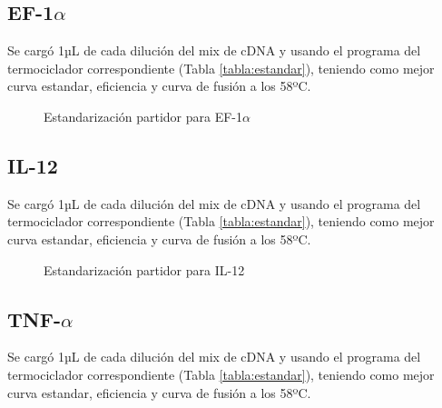 \documentclass[12pt,a4paper,oneside]{scrbook}
\begin{document}
\subsection{EF-1$\alpha$}

Se cargó 1µL de cada dilución del mix de cDNA y usando el programa del
termociclador correspondiente (Tabla \ref{tabla:estandar}), teniendo
como mejor curva estandar, eficiencia y curva de fusión a los 58ºC.

\begin{figure}[h!]
    \centering
    \caption {Estandarización partidor para EF-1$\alpha$}
    \label {fig:ef1a}
\end{figure}

\subsection{IL-12}

Se cargó 1µL de cada dilución del mix de cDNA y usando el programa del
termociclador correspondiente (Tabla \ref{tabla:estandar}), teniendo
como mejor curva estandar, eficiencia y curva de fusión a los 58ºC.

\begin{figure}[h!]
    \centering
    \caption {Estandarización partidor para IL-12}
    \label {fig:il12}
\end{figure}

\subsection{TNF-$\alpha$}

Se cargó 1µL de cada dilución del mix de cDNA y usando el programa del
termociclador correspondiente (Tabla \ref{tabla:estandar}), teniendo
como mejor curva estandar, eficiencia y curva de fusión a los 58ºC.
\end{document}
